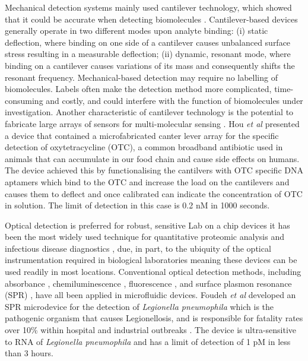 Mechanical detection systems mainly used cantilever technology, which showed that it could be accurate
when detecting biomolecules \citep{waggoner2007micro}. Cantilever-based devices generally operate in two
different modes upon analyte binding: (i) static deflection, where binding on one side of a cantilever
causes unbalanced surface stress resulting in a measurable deflection; (ii) dynamic, resonant mode, where
binding on a cantilever causes variations of its mass and consequently shifts the resonant frequency.
Mechanical-based detection may require no labelling of biomolecules. Labels often make the detection
method more complicated, time-consuming and costly, and could interfere with the function of biomolecules
under investigation. Another characteristic of cantilever technology is the potential to fabricate large
arrays of sensors for multi-molecular sensing \citep{ferrari2005cancer}. Hou \textit{et al} \citep{hou2013aptamer} presented
a device that contained a microfabricated canter lever array  for the  specific detection of
oxytetracycline (OTC), a common broadband antibiotic used in animals that can accumulate in our food chain
and cause side effects on humans. The device achieved this by functionalising the cantilvers with OTC
specific DNA aptamers which bind to the OTC and increase the load on the cantilevers and causes them
to deflect and once calibrated can indicate the concentration of OTC in solution. The limit of detection
in this case is 0.2 nM in 1000 seconds.

Optical detection is preferred for robust, sensitive Lab on a chip devices it has been the most widely
used technique for quantitative proteomic analysis \citep{rusling2010measurement} and infectious disease
diagnostics \citep{foudeh2012microfluidic}, due, in part, to the ubiquity of the optical instrumentation
required in biological laboratories meaning these devices can be used readily in most locations.
Conventional optical detection methods, including absorbance \citep{wang2011integration},
chemiluminescence \citep{wojciechowski2009organic}, fluorescence \citep{yildirim2012aptamer}, and surface
plasmon resonance (SPR) \citep{foudeh2014sub}, have all been applied in microfluidic devices. Foudeh
\textit{ et al} \citep{foudeh2014sub} developed an SPR microdevice for the detection of
\textit{Legionella pneumophila} which is the pathogenic organism that causes Legionellosis, and
is responsible for fatality rates over 10\% within hospital and industrial outbreaks
\citep{swanson2000legionella}. The device is ultra-sensitive to RNA of \textit{Legionella pneumophila}
and has a limit of detection of 1 pM in less than 3 hours.

